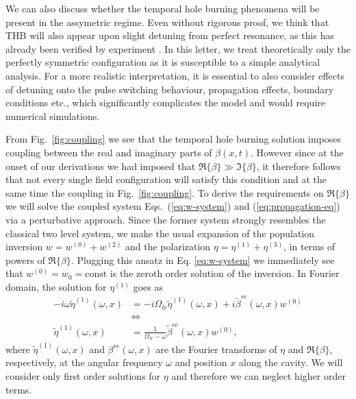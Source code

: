 \documentclass[onecolumn,secnumarabic,amssymb, nobibnotes, aip, prd]{revtex4-1}
\def\t{\tilde}
\def\om{\omega}
\begin{document}
We can also discuss whether the temporal hole burning phenomena will be present in the assymetric regime. Even without rigorous proof, we think that THB will also appear upon slight detuning from perfect resonance, as this has already been verified by experiment \cite{burghoff2015evaluating}. In this letter, we treat theoretically only the perfectly symmetric configuration as it is susceptible to a simple analytical analysis. For a more realistic interpretation, it is essential to also consider effects of detuning onto the pulse switching behaviour, propagation effects, boundary conditions etc., which significantly complicates the model and would require numerical simulations.


From Fig.~\ref{fig:coupling} we see that the temporal hole burning solution imposes coupling between the real and imaginary parts of $\beta(x,t)$. However since at the onset of our derivations we had imposed that $\Re\{\beta\} \gg \Im\{\beta\}$, it therefore follows that not every single field configuration will satisfy this condition and at the same time the coupling in Fig.~\ref{fig:coupling}. To derive the requirements on $\Re\{\beta\}$ we will solve the coupled system Eqs.~(\ref{eq:w-system}) and (\ref{eq:propagation-eq}) via a perturbative approach. Since the former system strongly resembles the classical two level system, we make the usual expansion of the population inversion $w=w^{(0)} + w^{(2)}$ and the polarization $\eta = \eta^{(1)} + \eta^{(3)}$, in terms of powers of $\Re\{\beta\}$. Plugging this ansatz in Eq. \ref{eq:w-system} we immediately see that $w^{(0)} = w_0 = \text{const}$ is the zeroth order solution of the inversion. In Fourier domain, the solution for $\eta^{(1)}$ goes as
\begin{align}
-i\om\t\eta^{(1)}(\om,x) &= -i\Omega_{lr}\t\eta^{(1)}(\om,x) +i\t\beta^{re}(\om,x)w^{(0)} \nonumber \\
	&\Leftrightarrow \nonumber \\
	\t\eta^{(1)}(\om,x) &= \frac{1}{\Omega_{lr}-\om}\t\beta^{re}(\om,x)w^{(0)}, \label{eq:eta-1-solution} 
\end{align}
where $\t\eta^{(1)}(\om,x) $ and $\beta^{re}(\om,x)$ are the Fourier transforms of $\eta$ and $\Re\{\beta\}$, respectively, at the angular frequency $\omega$ and position $x$ along the cavity. We will consider only first order solutions for $\eta$ and therefore we can neglect higher order terms. 
\end{document}
